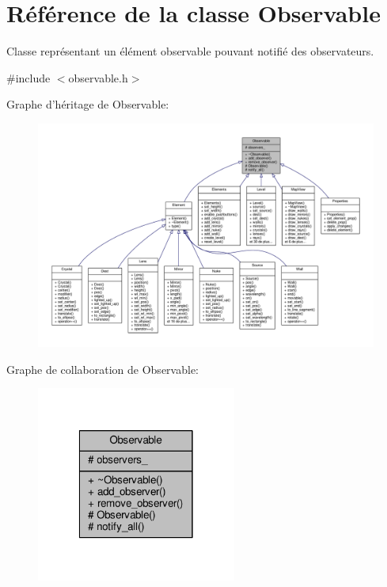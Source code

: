 \hypertarget{classObservable}{\section{Référence de la classe Observable}
\label{classObservable}
}


Classe représentant un élément observable pouvant notifié des observateurs.  




{\ttfamily \#include $<$observable.\+h$>$}



Graphe d'héritage de Observable\+:
\nopagebreak
\begin{figure}[H]
\begin{center}
\leavevmode
\includegraphics[width=350pt]{d7/d7e/classObservable__inherit__graph}
\end{center}
\end{figure}


Graphe de collaboration de Observable\+:\nopagebreak
\begin{figure}[H]
\begin{center}
\leavevmode
\includegraphics[width=186pt]{df/da6/classObservable__coll__graph}
\end{center}
\end{figure}
